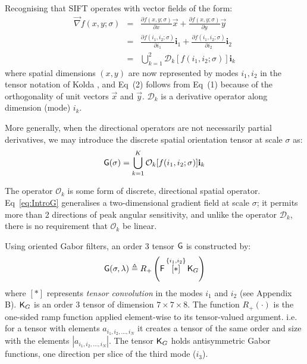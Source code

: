 Recognising that SIFT operates with vector fields of the form:
\begin{eqnarray}
\vec{\nabla} f(x,y;\sigma) &=& \frac{\partial f(x,y;\sigma)}{\partial x}\vec{x} + \frac{\partial f(x,y;\sigma)}{\partial y}\vec{y}\nonumber \\
&=& \frac{\partial f(i_1,i_2;\sigma)}{\partial i_1}\mathbf{i}_1 + \frac{\partial f(i_1,i_2;\sigma)}{\partial i_2}\mathbf{i}_2\\
&=& \bigcup_{k=1}^2 \mathcal{D}_k [ f(i_1,i_2;\sigma) ] \mathbf{i}_k 
\end{eqnarray}
where spatial dimensions $(x,y)$ are now represented by modes $i_1,i_2$ in the tensor notation of Kolda \citep{kolda2009tensor}, and Eq~(2) follows from Eq~(1) because of the orthogonality of unit vectors $\vec{x}$ and $\vec{y}$.  $\mathcal{D}_k$ is a derivative operator along dimension (mode) $i_k$. 

More generally, when the directional operators are not necessarily partial derivatives, we may introduce the discrete spatial orientation tensor at scale $\sigma$ as:
\begin{equation}
\mathsf{G(\sigma)}  = \bigcup_{k=1}^K \mathcal{O}_k [ f(i_1,i_2;\sigma) ] \mathbf{i}_k 
\label{eq:IntroG}
\end{equation}

The operator $\mathcal{O}_k$ is some form of discrete, directional spatial operator. Eq~\ref{eq:IntroG} generalises a two-dimensional gradient field at scale $\sigma$; it permits more than 2 directions of peak angular sensitivity, and unlike the operator $\mathcal{D}_k$, there is no requirement that $\mathcal{O}_k$ be linear.

Using oriented Gabor filters, an order 3 tensor $\mathsf{G}$ is constructed by:
\begin{equation}
\mathsf{G}(\sigma,\lambda) \triangleq R_+ \left ( \mathsf{F} \, \overset{\lbrace i_1,i_2\rbrace}{[ \ast ]}\, {\mathsf{K}_{G}} \right )
\end{equation}
where $[ \ast ]$ represents {\it tensor convolution} in the modes $i_1$ and $i_2$ (see Appendix B). $\mathsf{K}_{G}$ is an order 3 tensor of dimension $7 \times 7 \times 8$. The function $R_+(\cdot)$ is the one-sided ramp function applied element-wise to its tensor-valued argument. i.e. for a tensor with elements $a_{i_1,i_2,...,i_N}$ it creates a tensor of the same order and size with the elements $|a_{i_1,i_2,...,i_N}|$.  The tensor $\mathsf{K}_{G}$ holds antisymmetric Gabor functions, one direction per slice of the third mode ($i_3$). 

